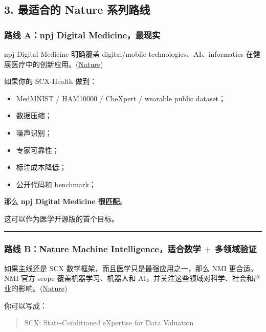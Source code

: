 \documentclass[
  12pt,
]{ctexart}
\providecommand{\tightlist}{%
  \setlength{\itemsep}{0pt}\setlength{\parskip}{0pt}}
\begin{document}
\subsection{3. 最适合的 Nature
系列路线}\label{ux6700ux9002ux5408ux7684-nature-ux7cfbux5217ux8defux7ebf}

\subsubsection{路线 A：npj Digital
Medicine，最现实}\label{ux8defux7ebf-anpj-digital-medicineux6700ux73b0ux5b9e}

npj Digital Medicine 明确覆盖 digital/mobile
technologies、AI、informatics
在健康医疗中的创新应用。(\href{https://arxiv.org/abs/2501.07314?utm_source=chatgpt.com}{Nature})

如果你的 SCX-Health 做到：

\begin{itemize}
\tightlist
\item
  MedMNIST / HAM10000 / CheXpert / wearable public dataset；
\item
  数据压缩；
\item
  噪声识别；
\item
  专家可靠性；
\item
  标注成本降低；
\item
  公开代码和 benchmark；
\end{itemize}

那么 \textbf{npj Digital Medicine 很匹配}。

这可以作为医学开源版的首个目标。

\begin{center}\rule{0.5\linewidth}{0.5pt}\end{center}

\subsubsection{路线 B：Nature Machine Intelligence，适合数学 +
多领域验证}\label{ux8defux7ebf-bnature-machine-intelligenceux9002ux5408ux6570ux5b66-ux591aux9886ux57dfux9a8cux8bc1}

如果主线还是 SCX 数学框架，而且医学只是最强应用之一，那么 NMI
更合适。NMI 官方 scope 覆盖机器学习、机器人和
AI，并关注这些领域对科学、社会和产业的影响。(\href{https://arxiv.org/abs/2505.05427?utm_source=chatgpt.com}{Nature})

你可以写成：

\begin{quote}
SCX: State-Conditioned eXpertise for Data Valuation
\end{quote}
\end{document}
